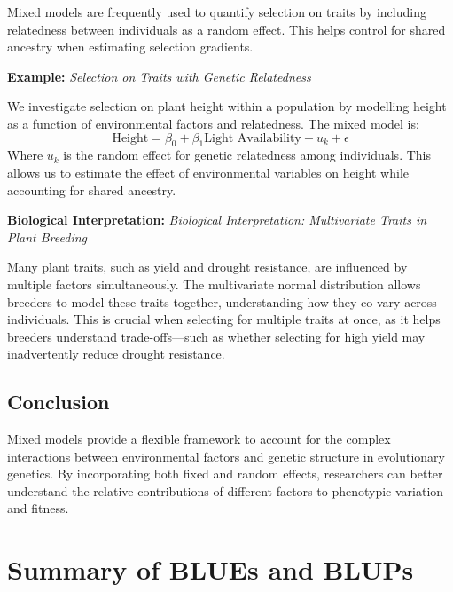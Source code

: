 \documentclass[12pt,a4paper]{article}
\newenvironment{example}[1][]
{\begin{basebox}[linecolor=uqgold]
\textbf{\color{uqgold}Example:} \textit{#1}\par\noindent\ignorespaces}
{\end{basebox}}
\newenvironment{interpretation}[1][]
{\begin{basebox}[linecolor=uqgreen]
\textbf{\color{uqgreen}Biological Interpretation:} \textit{#1}\par\noindent\ignorespaces}
{\end{basebox}}
\begin{document}
Mixed models are frequently used to quantify selection on traits by including relatedness between individuals as a random effect. This helps control for shared ancestry when estimating selection gradients.

\begin{example}[Selection on Traits with Genetic Relatedness]
We investigate selection on plant height within a population by modelling height as a function of environmental factors and relatedness. The mixed model is:
\[
\text{Height} = \beta_0 + \beta_1 \text{Light Availability} + u_k + \epsilon
\]
Where \( u_k \) is the random effect for genetic relatedness among individuals. This allows us to estimate the effect of environmental variables on height while accounting for shared ancestry.
\end{example}

\begin{interpretation}[Biological Interpretation: Multivariate Traits in Plant Breeding]
Many plant traits, such as yield and drought resistance, are influenced by multiple factors simultaneously. The multivariate normal distribution allows breeders to model these traits together, understanding how they co-vary across individuals. This is crucial when selecting for multiple traits at once, as it helps breeders understand trade-offs—such as whether selecting for high yield may inadvertently reduce drought resistance.
\end{interpretation}


\subsection{Conclusion}

Mixed models provide a flexible framework to account for the complex interactions between environmental factors and genetic structure in evolutionary genetics. By incorporating both fixed and random effects, researchers can better understand the relative contributions of different factors to phenotypic variation and fitness.

\section{Summary of BLUEs and BLUPs}
\end{document}
